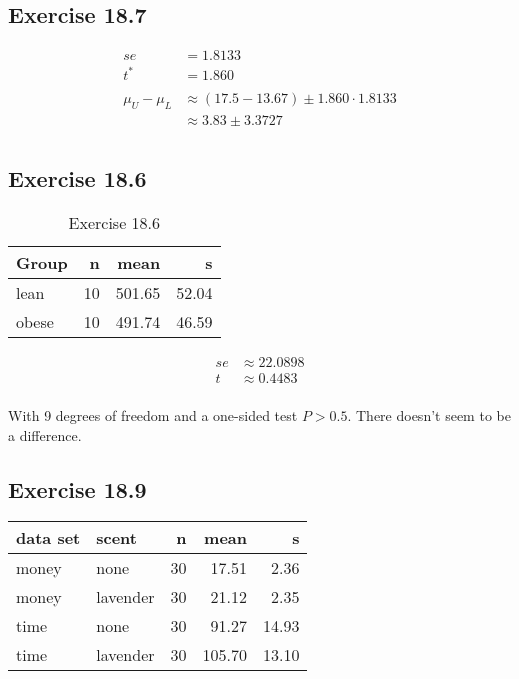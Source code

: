 \documentclass[letterpaper, landscape]{exam}
\begin{document}
  \subsection{Exercise 18.7} %

  \begin{align*}
    se &= 1.8133 \\
    t^* &= 1.860 \\
    \\
    \mu_U - \mu_L & \approx (17.5 - 13.67) \pm 1.860 \cdot 1.8133 \\
                  & \approx 3.83 \pm 3.3727 \\
  \end{align*}
  
  \subsection{Exercise 18.6} %

  \begin{table}[ht]
    \centering
    \begin{tabular}{lrrr}
      \toprule
      Group & n  & mean   & s \\
      \midrule
      lean  & 10 & 501.65 & 52.04 \\
      obese & 10 & 491.74 & 46.59 \\
      \bottomrule
    \end{tabular}
    \caption{Exercise 18.6}
  \end{table}
  
  \begin{align*}
    se & \approx 22.0898 \\
    t  & \approx 0.4483 \\
  \end{align*}

  With 9 degrees of freedom and a one-sided test $P > 0.5$. There doesn't seem to be
  a difference.

  \subsection{Exercise 18.9} %

  \begin{table}[ht]
    \centering
    \begin{tabular}{llrrr}
      \toprule
      data set & scent    & n  & mean   & s \\
      \midrule
      money    & none     & 30 & 17.51  & 2.36 \\
      money    & lavender & 30 & 21.12  & 2.35 \\
      time     & none     & 30 & 91.27  & 14.93 \\
      time     & lavender & 30 & 105.70 & 13.10 \\
       \bottomrule
    \end{tabular}
  \end{table}


  
\end{document}
